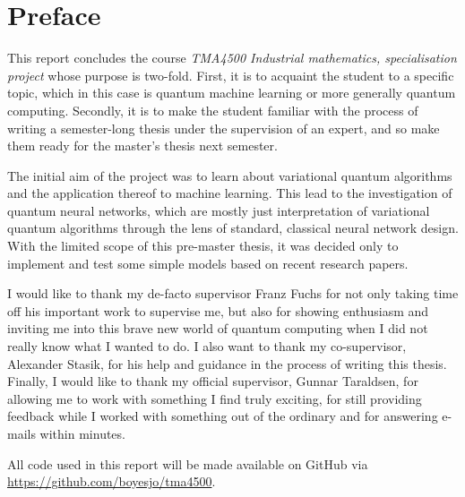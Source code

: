 \section*{Preface}
This report concludes the course \textit{TMA4500 Industrial mathematics, specialisation project} whose purpose is two-fold.
First, it is to acquaint the student to a specific topic, which in this case is quantum machine learning or more generally quantum computing.
Secondly, it is to make the student familiar with the process of writing a semester-long thesis under the supervision of an expert, and so make them ready for the master's thesis next semester.

The initial aim of the project was to learn about variational quantum algorithms and the application thereof to machine learning.
This lead to the investigation of quantum neural networks, which are mostly just interpretation of variational quantum algorithms through the lens of standard, classical neural network design.
With the limited scope of this pre-master thesis, it was decided only to implement and test some simple models based on recent research papers.

I would like to thank my de-facto supervisor Franz Fuchs for not only taking time off his important work to supervise me, but also for showing enthusiasm and inviting me into this brave new world of quantum computing when I did not really know what I wanted to do.
I also want to thank my co-supervisor, Alexander Stasik, for his help and guidance in the process of writing this thesis.
Finally, I would like to thank my official supervisor, Gunnar Taraldsen, for allowing me to work with something I find truly exciting, for still providing feedback while I worked with something out of the ordinary and for answering e-mails within minutes.

All code used in this report will be made available on GitHub via \url{https://github.com/boyesjo/tma4500}.



\cleardoublepage